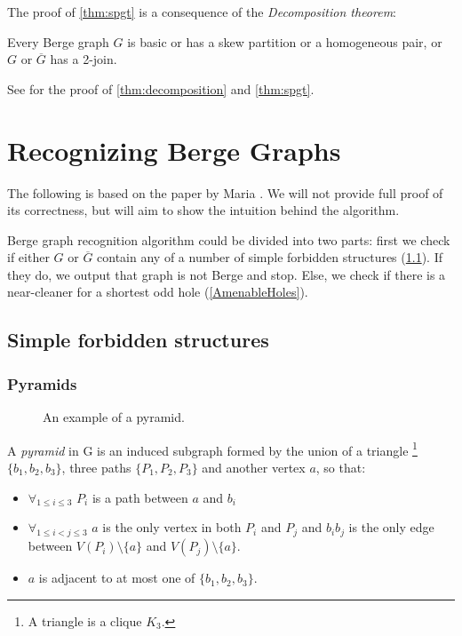The proof of \cref{thm:spgt} is a consequence of the \emph{Decomposition theorem}:
\begin{theorem}
	\label{thm:decomposition}
	Every Berge graph $G$ is basic or has a skew partition or a homogeneous pair, or $G$ or $\overline{G}$ has a 2-join.
\end{theorem}

See \cite{MC06} for the proof of \cref{thm:decomposition} and \cref{thm:spgt}.

\section{Recognizing Berge Graphs}
\label{sec:recognizingBerge}

The following is based on the paper by Maria \citeauthor{MC05}  \cite{MC05}. We will not provide full proof of its correctness, but will aim to show the intuition behind the algorithm.

Berge graph recognition algorithm could be divided into two parts: first we check if either $G$ or $\overline{G}$ contain any of a number of simple forbidden structures (\cref{SimpleStructures}). If they do, we output that graph is not Berge and stop. Else, we check if there is a near-cleaner for a shortest odd hole (\cref{AmenableHoles}).

\subsection{Simple forbidden structures}
\label{SimpleStructures}

\subsubsection{Pyramids}

\begin{wrapfigure}{r}{0.35\textwidth}
	
	\caption{An example  of a pyramid.}%
	\vspace{-1.2cm}
\end{wrapfigure}


A \emph{pyramid} in G is an induced subgraph formed by the union of a triangle \footnote{A triangle is a clique $K_3$.} $\{b_1,b_2,b_3\}$, three paths $\{P_1, P_2, P_3\}$ and another vertex $a$, so that:
\begin{itemize}
	\item $\forall_{1\leq i \leq 3}$ $P_i$ is a path between $a$ and $b_i$
	\item $\forall_{1\leq i < j \leq 3}$ $a$ is the only vertex in both $P_i$ and $P_j$ and $b_ib_j$ is the only edge between $V(P_i)\setminus\{a\}$ and $V(P_j)\setminus\{a\}$.
	\item $a$ is adjacent to at most one of $\{b_1, b_2, b_3\}$.
\end{itemize}


